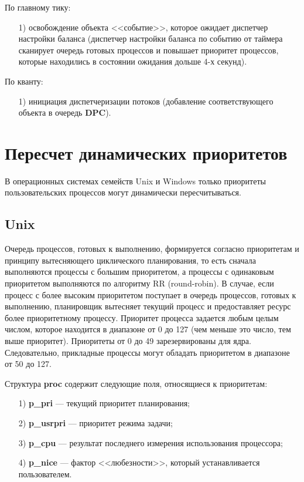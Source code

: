 \documentclass{bmstu}
\begin{document}
По главному тику:
\begin{enumerate}
\item[1)] освобождение объекта <<событие>>, которое ожидает диспетчер настройки баланса (диспетчер настройки баланса по событию от таймера сканирует очередь готовых процессов и повышает приоритет процессов, которые находились в состоянии ожидания дольше 4-х секунд). 
\end{enumerate}

По кванту:
\begin{enumerate}
\item[1)] инициация диспетчеризации потоков (добавление соответствующего объекта в очередь \textbf{DPC}).
\end{enumerate}

\chapter{Пересчет динамических приоритетов}

В операционных системах семейств Unix и Windows только приоритеты пользовательских процессов могут динамически пересчитываться.

\section{Unix}

Очередь процессов, готовых к выполнению, формируется согласно приоритетам и принципу вытесняющего циклического планирования, то есть сначала выполняются процессы с большим приоритетом, а процессы с одинаковым приоритетом выполняются по алгоритму RR (round-robin). 
В случае, если процесс с более высоким приоритетом поступает в очередь процессов, готовых к выполнению, планировщик вытесняет текущий процесс и предоставляет ресурс более приоритетному
процессу. 
Приоритет процесса задается любым целым числом, которое находится в диапазоне от 0 до 127 (чем меньше это число, тем выше приоритет). 
Приоритеты от 0 до 49 зарезервированы для ядра. Следовательно, прикладные процессы могут обладать приоритетом в диапазоне от 50 до 127.

Структура \textbf{proc} содержит следующие поля, относящиеся к приоритетам:
\begin{enumerate}
\item[1)] \textbf{p\_pri} --- текущий приоритет планирования;
\item[2)] \textbf{p\_usrpri} --- приоритет режима задачи;
\item[3)] \textbf{p\_cpu} --- результат последнего измерения использования процессора;
\item[4)] \textbf{p\_nice} --- фактор <<любезности>>, который устанавливается пользователем.
\end{enumerate}
\end{document}
